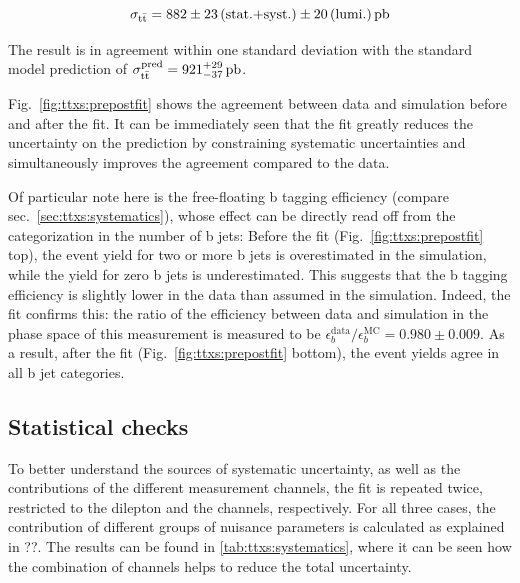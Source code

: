 \[
    \sigma_{\mathrm{t \bar{t}}} = 882 \pm 23 \, \text{(stat.+syst.)} \pm 20 \, \text{(lumi.)} \, \text{pb}
\]

The result is in agreement within one standard deviation with the standard model prediction of $\sigma_{\mathrm{t \bar{t}}}^{\text{pred}} = 921^{+29}_{-37} \, \text{pb}$.

Fig.~\ref{fig:ttxs:prepostfit} shows the agreement between data and simulation before and after the fit. It can be immediately seen that the fit greatly reduces the uncertainty on the prediction by constraining systematic uncertainties and simultaneously improves the agreement compared to the data. 

Of particular note here is the free-floating b tagging efficiency (compare sec.~\ref{sec:ttxs:systematics}), whose effect can be directly read off from the categorization in the number of b jets: Before the fit (Fig.~\ref{fig:ttxs:prepostfit} top), the event yield for two or more b jets is overestimated in the simulation, while the yield for zero b jets is underestimated. This suggests that the b tagging efficiency is slightly lower in the data than assumed in the simulation. Indeed, the fit confirms this: the ratio of the efficiency between data and simulation in the phase space of this measurement is measured to be $\epsilon_b^{\mathrm{data}}/\epsilon_b^{\mathrm{MC}} = 0.980 \pm 0.009$. As a result, after the fit (Fig.~\ref{fig:ttxs:prepostfit} bottom), the event yields agree in all b jet categories.

\subsection{Statistical checks}

To better understand the sources of systematic uncertainty, as well as the contributions of the different measurement channels, the fit is repeated twice, restricted to the dilepton and the \ljets channels, respectively. For all three cases, the contribution of different groups of nuisance parameters is calculated as explained in ??. The results can be found in \cref{tab:ttxs:systematics}, where it can be seen how the combination of channels helps to reduce the total uncertainty. 


